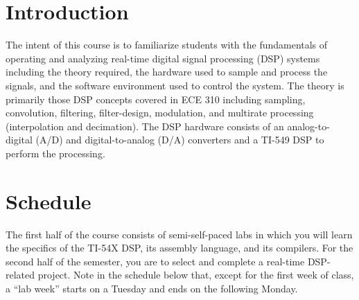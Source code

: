 \documentclass[11pt]{handout}
\begin{document}
\section{Introduction}

The intent of this course is to familiarize students
with the fundamentals of 
operating and analyzing real-time digital signal processing
(DSP) systems including the
theory required, the hardware used to sample and process the signals, and
the software environment used to control the system.
The theory is
primarily those DSP concepts covered in ECE 310 including sampling, 
convolution,
filtering, filter-design, modulation, and multirate processing
(interpolation and decimation).  The DSP hardware consists of
an analog-to-digital (A/D) and digital-to-analog (D/A) converters 
and a TI-549  DSP to perform the processing.


\section{Schedule}

The first half of the course consists of semi-self-paced labs
in which you will learn the specifics of the TI-54X DSP,  its assembly 
language, and its compilers.
For the second half of the semester, you are to select and
complete a real-time DSP-related project.  Note in the schedule 
below that, except for the first week of class, a ``lab week'' starts on a 
Tuesday and ends on the following Monday.
\end{document}
